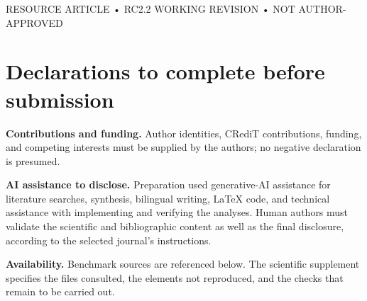 \documentclass[10pt,a4paper]{article}
\begin{document}
\thispagestyle{empty}
\begin{center}
{\small RESOURCE ARTICLE • RC2.2 WORKING REVISION • NOT AUTHOR-APPROVED\par}
\vspace{10pt}
{\LARGE\bfseries\PaperTitle\par}
\vspace{12pt}
{\normalsize\PaperAuthors\par}
\vspace{3pt}
{\small\itshape\PaperAffiliation\par}
\end{center}
\vspace{8pt}
\begin{abstract}

\end{abstract}
\vspace{10pt}

\section*{Declarations to complete before submission}
\noindent\textbf{Contributions and funding.} Author identities, CRediT contributions, funding, and competing interests must be supplied by the authors; no negative declaration is presumed.\par
\noindent\textbf{AI assistance to disclose.} Preparation used generative-AI assistance for literature searches, synthesis, bilingual writing, LaTeX code, and technical assistance with implementing and verifying the analyses. Human authors must validate the scientific and bibliographic content as well as the final disclosure, according to the selected journal's instructions.\par
\noindent\textbf{Availability.} Benchmark sources are referenced below. The scientific supplement specifies the files consulted, the elements not reproduced, and the checks that remain to be carried out.


\end{document}
